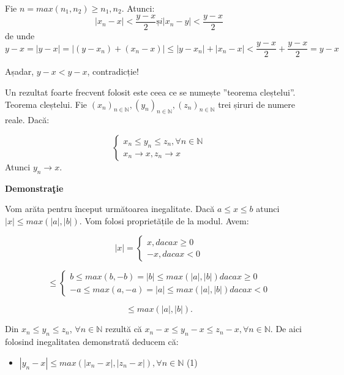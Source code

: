 \documentclass[a4paper,12pt,oneside]{report}
\begin{document}
Fie \(n = max (n _{1}, n_{2}) \geq n_{1}, n_{2}.\) Atunci: 
\[\left | x_{n} - x \right | < \frac{y-x}{2} și \left | x_{n} - y  \right | <  \frac{y-x}{2}\]
de unde 
\[y-x = \left | y-x \right | = \left | (y-x_{n})+ (x_{n} -x) \right |\leq \left | y-x_{n} \right | + \left | x_{n} - x \right | < \frac{y-x}{2} + \frac{y-x}{2} = y-x\]

Așadar, \(y-x < y-x\), contradicție!

Un rezultat foarte frecvent folosit este ceea ce se numește ”teorema cleștelui”.
Teorema cleștelui. Fie \((x_{n})_{n\in \mathbb{N}}, (y_{n})_{n\in \mathbb{N}},(z_{n})_{n\in \mathbb{N}} \) trei șiruri de numere reale. 
Dacă:

\[\left\{\begin{matrix}
x_{n} \leq  y_{n} \leq z_{n}, \forall  n \in \mathbb{N}\\ 
x_{n} \to x, z_{n} \rightarrow x

\end{matrix}\right. \]
Atunci \(y_{n} \to x\).

\textbf{Demonstra\c tie}

Vom arăta pentru început următoarea inegalitate. Dacă \(a \leq x\leq b\) atunci \(\left | x \right | \leq  max (\left | a \right |, \left | b \right |) \). 
Vom folosi proprietățile de la modul. Avem:

\[\left | x \right | = \left\{\begin{matrix}
x, daca x \geq 0\\ 
-x, daca x< 0
\end{matrix}\right. \]

\[ \leq \left\{\begin{matrix}
b\leq max(b,-b) = \left | b \right |\leq max(\left | a \right |,\left | b \right |) daca x\geq 0\\ 
-a\leq max(a,-a) = \left | a \right | \leq max (\left | a \right |,\left | b \right |) daca x< 0
\end{matrix}\right. \]

\[ \leq max (\left | a \right |, \left | b \right |) . \]

Din \(x_{n} \leq y_{n}\leq z_{n}\), \(\forall n\in \mathbb{N} \) rezultă că \(x_{n}-x \leq y_{n}-x \leq z_{n}-x, \forall n\in \mathbb{N}. \)
De aici folosind inegalitatea demonstrată deducem că:

\begin{itemize}
  \item \(\left | y_{n} - x \right |\leq max (\left | x_{n}-x \right |, \left | z_{n} - x \right |),\forall n\in \mathbb{N}\) (1)
\end{itemize}
\end{document}
